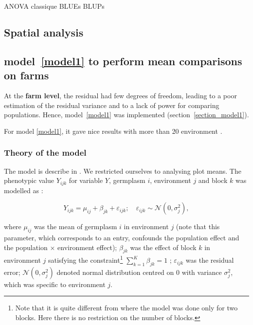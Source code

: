 \documentclass{article}\usepackage[]{graphicx}\usepackage[]{color}
\begin{document}
ANOVA classique BLUEs BLUPs
\newpage


\subsection{Spatial analysis}
\label{spatial_analysis}



\newpage


\subsection{model~\ref{model1} to perform mean comparisons on farms }
\label{model_1}

At the \textbf{farm level}, the residual had few degrees of freedom, leading to a poor estimation of the residual variance and to a lack of power for comparing populations.
Hence, model~\ref{model1} was implemented (section~\ref{section_model1}).

For model \ref{model1}, it gave nice results with more than 20 environment \citep{riviere_hierarchical_2015}.

\subsubsection{Theory of the model}

The model is describe in \citet{riviere_hierarchical_2015}.
We restricted ourselves to analysing plot means.
The phenotypic value $Y_{ijk}$ for variable $Y$, germplasm $i$, environment $j$ and block $k$ was modelled as :

\begin{equation}
	Y_{ijk} = \mu_{ij} + \beta_{jk} + \varepsilon_{ijk} ; \quad \varepsilon_{ijk} \sim \mathcal{N} (0,\sigma^2_{j}),
	\label{model1}
\end{equation}

where
$\mu_{ij}$ was the mean of germplasm $i$ in environment $j$ (note that this parameter, which corresponds to an entry, confounds the population effect and the population $\times$ environment effect);
$\beta_{jk}$ was the effect of block $k$ in environment $j$ satisfying the constraint\footnote{Note that it is quite different from \citet{riviere_hierarchical_2015} where the model was done only for two blocks. Here there is no restriction on the number of blocks.} $\sum\limits_{k=1}^K \beta_{jk} = 1$ ;
$\varepsilon_{ijk}$ was the residual error;
$\mathcal{N} (0,\sigma^2_{j})$ denoted normal distribution centred on 0 with variance $\sigma^2_{j}$, which was specific to environment $j$.
\end{document}
